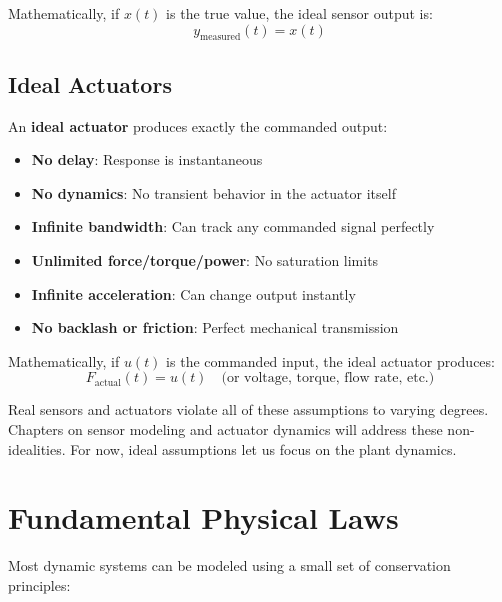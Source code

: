 Mathematically, if $x(t)$ is the true value, the ideal sensor output is:
\begin{equation}
y_{\text{measured}}(t) = x(t)
\end{equation}

\subsection{Ideal Actuators}

An \textbf{ideal actuator} produces exactly the commanded output:

\begin{itemize}
    \item \textbf{No delay}: Response is instantaneous
    \item \textbf{No dynamics}: No transient behavior in the actuator itself
    \item \textbf{Infinite bandwidth}: Can track any commanded signal perfectly
    \item \textbf{Unlimited force/torque/power}: No saturation limits
    \item \textbf{Infinite acceleration}: Can change output instantly
    \item \textbf{No backlash or friction}: Perfect mechanical transmission
\end{itemize}

Mathematically, if $u(t)$ is the commanded input, the ideal actuator produces:
\begin{equation}
F_{\text{actual}}(t) = u(t) \quad \text{(or voltage, torque, flow rate, etc.)}
\end{equation}

\begin{warningbox}
Real sensors and actuators violate all of these assumptions to varying degrees. Chapters on sensor modeling and actuator dynamics will address these non-idealities. For now, ideal assumptions let us focus on the plant dynamics.
\end{warningbox}

\section{Fundamental Physical Laws}
\label{sec:physical_laws}

Most dynamic systems can be modeled using a small set of conservation principles:

